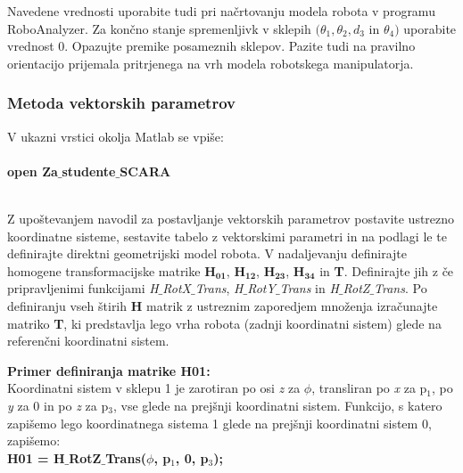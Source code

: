 Navedene vrednosti uporabite tudi pri načrtovanju modela robota v programu
RoboAnalyzer.  Za končno stanje spremenljivk v sklepih
$(\theta_1, \theta_2, d_3$ in $\theta_4)$ uporabite vrednost $0$. Opazujte
premike posameznih sklepov. Pazite tudi na pravilno orientacijo prijemala
pritrjenega na vrh modela robotskega manipulatorja.

\subsubsection{Metoda vektorskih parametrov}

V ukazni vrstici okolja Matlab se vpiše:\\
\vspace{-0.4cm}\\%
\textbf{open Za$\_$studente$\_$SCARA}  \\ %
\vspace{-0.4cm}\\%


\begin{mdframed}[backgroundcolor=green!20, shadow=false,roundcorner=12pt,topline
=false, rightline=false,bottomline=false,leftline=false]
        \vspace{0.2cm}
Z upoštevanjem navodil za postavljanje vektorskih parametrov
postavite ustrezno koordinatne sisteme, sestavite tabelo z
vektorskimi parametri in na podlagi le te definirajte direktni
geometrijski model robota. V nadaljevanju definirajte homogene
transformacijske matrike \textbf{H}$_\textbf{01}$,
\textbf{H}$_\textbf{12}$, \textbf{H}$_\textbf{23}$,
\textbf{H}$_\textbf{34}$ in \textbf{T}. Definirajte jih z če
pripravljenimi funkcijami \emph{H$\_$RotX$\_$Trans},
\emph{H$\_$RotY$\_$Trans} in \emph{H$\_$RotZ$\_$Trans}. Po
definiranju vseh štirih \textbf{H} matrik z ustreznim zaporedjem
množenja izračunajte matriko \textbf{T}, ki predstavlja lego vrha
robota (zadnji koordinatni sistem) glede na referenčni koordinatni
sistem.
\end{mdframed}


\begin{mdframed}[backgroundcolor=blue!20, shadow=false,roundcorner=12pt,topline
=false, rightline=false,bottomline=false,leftline=false]
        \vspace{0.2cm}
\textbf{Primer definiranja matrike H01:}\\
Koordinatni sistem v sklepu 1 je zarotiran po osi \emph{z} za
$\phi$, transliran po \emph{x} za p$_1$, po \emph{y} za 0 in po
\emph{z} za p$_3$, vse glede na prejšnji koordinatni sistem.
Funkcijo, s katero zapišemo lego koordinatnega sistema 1 glede na
prejšnji koordinatni sistem 0, zapišemo:\vspace{0.2cm}\\%
\vspace{0.2cm}%
\hspace*{3.5cm}\textbf{H01 = H$\_$RotZ$\_$Trans($\phi$, p$_1$, 0,
p$_3$);}
        \vspace{0.0cm}
    \end{mdframed}

